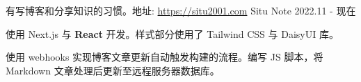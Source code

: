 
\begin{cventries}



    \cventry
    {有写博客和分享知识的习惯。地址: \href{https://situ2001.com}{https://situ2001.com}} %
    {Situ Note} %
    {} %
    {2022.11 - 现在} %
    {
        \begin{cvitems} %
            \item {使用 Next.js 与 \textbf{React} 开发。样式部分使用了 Tailwind CSS 与 DaisyUI 库。}
            \item {使用 webhooks 实现博客文章更新自动触发构建的流程。编写 JS 脚本，将 Markdown 文章处理后更新至远程服务器数据库。}
        \end{cvitems}
    }

\end{cventries}
